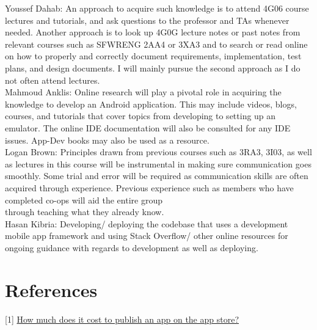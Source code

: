 \documentclass[12pt,letterpaper]{article}
\begin{document}
\noindent Youssef Dahab: An approach to acquire such knowledge is to attend 4G06 course lectures and tutorials, and ask questions to the professor and TAs whenever needed. Another approach is to look up 4G0G lecture notes or past notes from relevant courses such as SFWRENG 2AA4 or 3XA3 and to search or read online on how to properly and correctly document requirements, implementation, test plans, and design documents. I will mainly pursue the second approach as I do not often attend lectures.\\

\noindent Mahmoud Anklis: Online research will play a pivotal role in acquiring the knowledge to develop an Android application. This may include videos, blogs, courses, and tutorials that cover topics from developing to setting up an emulator. The online IDE documentation will also be consulted for any IDE issues. App-Dev books may also be used as a resource.\\

\noindent Logan Brown: Principles drawn from previous courses such as 3RA3, 3I03, as well as lectures in this course will be instrumental in making sure communication goes smoothly. Some trial and error will be required as communication skills are often acquired through experience. Previous experience such as members who have completed co-ops will aid the entire group\\ through teaching what they already know.\\

\noindent Hasan Kibria: Developing/ deploying the codebase that uses a development mobile app framework and using Stack Overflow/ other online resources for ongoing guidance with regards to development as well as deploying.\\

\newpage 

\section{References}
[1] \href{https://www.appypie.com/faqs/how-much-does-it-cost-to-publish-an-app-on-the-app-store}{\color{blue}How much does it cost to publish an app on the app store?}
\end{document}
